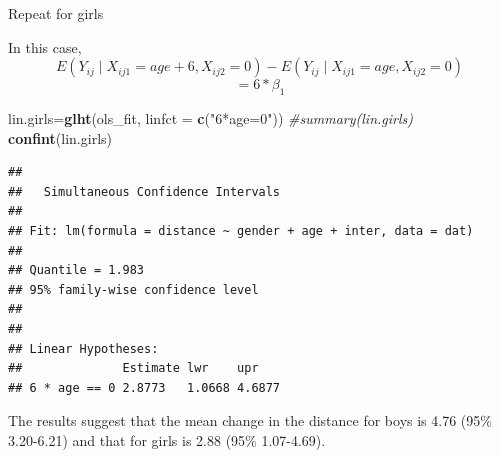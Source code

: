 \documentclass[ignorenonframetext,]{beamer}
\newenvironment{Shaded}{\begin{snugshade}}{\end{snugshade}}
\newcommand{\KeywordTok}[1]{\textcolor[rgb]{0.13,0.29,0.53}{\textbf{#1}}}
\newcommand{\DataTypeTok}[1]{\textcolor[rgb]{0.13,0.29,0.53}{#1}}
\newcommand{\StringTok}[1]{\textcolor[rgb]{0.31,0.60,0.02}{#1}}
\newcommand{\CommentTok}[1]{\textcolor[rgb]{0.56,0.35,0.01}{\textit{#1}}}
\newcommand{\NormalTok}[1]{#1}
\begin{document}
\begin{frame}[fragile]{Repeat for girls}

In this case,
\[ E(Y_{ij} \mid X_{ij1}=age+6,X_{ij2}=0) -  E(Y_{ij} \mid X_{ij1}=age,X_{ij2}=0) \]
\[ =  6*\beta_1\]

\tiny

\begin{Shaded}
\begin{Highlighting}[]
\NormalTok{lin.girls=}\KeywordTok{glht}\NormalTok{(ols_fit, }\DataTypeTok{linfct =} \KeywordTok{c}\NormalTok{(}\StringTok{"6*age=0"}\NormalTok{))}
\CommentTok{#summary(lin.girls)}
\KeywordTok{confint}\NormalTok{(lin.girls)  }
\end{Highlighting}
\end{Shaded}

\begin{verbatim}
## 
##   Simultaneous Confidence Intervals
## 
## Fit: lm(formula = distance ~ gender + age + inter, data = dat)
## 
## Quantile = 1.983
## 95% family-wise confidence level
##  
## 
## Linear Hypotheses:
##              Estimate lwr    upr   
## 6 * age == 0 2.8773   1.0668 4.6877
\end{verbatim}

The results suggest that the mean change in the distance for boys is
4.76 (95\% 3.20-6.21) and that for girls is 2.88 (95\% 1.07-4.69).

\end{frame}
\end{document}
